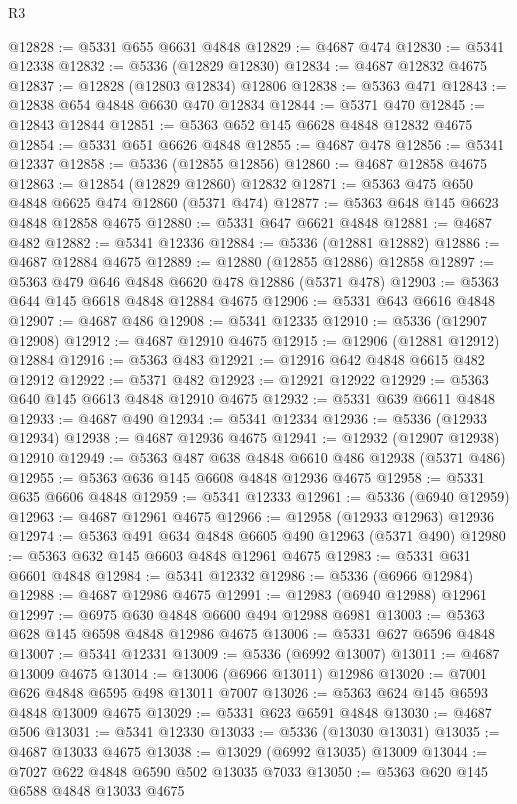 \begin{lexlean}{R3}
\begin{coremodule}
@12828 := @5331 @655 @6631 @4848
@12829 := @4687 @474
@12830 := @5341 @12338
@12832 := @5336 (@12829 @12830)
@12834 := @4687 @12832 @4675
@12837 := @12828 (@12803 @12834) @12806
@12838 := @5363 @471
@12843 := @12838 @654 @4848 @6630 @470 @12834
@12844 := @5371 @470
@12845 := @12843 @12844
@12851 := @5363 @652 @145 @6628 @4848 @12832 @4675
@12854 := @5331 @651 @6626 @4848
@12855 := @4687 @478
@12856 := @5341 @12337
@12858 := @5336 (@12855 @12856)
@12860 := @4687 @12858 @4675
@12863 := @12854 (@12829 @12860) @12832
@12871 := @5363 @475 @650 @4848 @6625 @474 @12860 (@5371 @474)
@12877 := @5363 @648 @145 @6623 @4848 @12858 @4675
@12880 := @5331 @647 @6621 @4848
@12881 := @4687 @482
@12882 := @5341 @12336
@12884 := @5336 (@12881 @12882)
@12886 := @4687 @12884 @4675
@12889 := @12880 (@12855 @12886) @12858
@12897 := @5363 @479 @646 @4848 @6620 @478 @12886 (@5371 @478)
@12903 := @5363 @644 @145 @6618 @4848 @12884 @4675
@12906 := @5331 @643 @6616 @4848
@12907 := @4687 @486
@12908 := @5341 @12335
@12910 := @5336 (@12907 @12908)
@12912 := @4687 @12910 @4675
@12915 := @12906 (@12881 @12912) @12884
@12916 := @5363 @483
@12921 := @12916 @642 @4848 @6615 @482 @12912
@12922 := @5371 @482
@12923 := @12921 @12922
@12929 := @5363 @640 @145 @6613 @4848 @12910 @4675
@12932 := @5331 @639 @6611 @4848
@12933 := @4687 @490
@12934 := @5341 @12334
@12936 := @5336 (@12933 @12934)
@12938 := @4687 @12936 @4675
@12941 := @12932 (@12907 @12938) @12910
@12949 := @5363 @487 @638 @4848 @6610 @486 @12938 (@5371 @486)
@12955 := @5363 @636 @145 @6608 @4848 @12936 @4675
@12958 := @5331 @635 @6606 @4848
@12959 := @5341 @12333
@12961 := @5336 (@6940 @12959)
@12963 := @4687 @12961 @4675
@12966 := @12958 (@12933 @12963) @12936
@12974 := @5363 @491 @634 @4848 @6605 @490 @12963 (@5371 @490)
@12980 := @5363 @632 @145 @6603 @4848 @12961 @4675
@12983 := @5331 @631 @6601 @4848
@12984 := @5341 @12332
@12986 := @5336 (@6966 @12984)
@12988 := @4687 @12986 @4675
@12991 := @12983 (@6940 @12988) @12961
@12997 := @6975 @630 @4848 @6600 @494 @12988 @6981
@13003 := @5363 @628 @145 @6598 @4848 @12986 @4675
@13006 := @5331 @627 @6596 @4848
@13007 := @5341 @12331
@13009 := @5336 (@6992 @13007)
@13011 := @4687 @13009 @4675
@13014 := @13006 (@6966 @13011) @12986
@13020 := @7001 @626 @4848 @6595 @498 @13011 @7007
@13026 := @5363 @624 @145 @6593 @4848 @13009 @4675
@13029 := @5331 @623 @6591 @4848
@13030 := @4687 @506
@13031 := @5341 @12330
@13033 := @5336 (@13030 @13031)
@13035 := @4687 @13033 @4675
@13038 := @13029 (@6992 @13035) @13009
@13044 := @7027 @622 @4848 @6590 @502 @13035 @7033
@13050 := @5363 @620 @145 @6588 @4848 @13033 @4675

\end{coremodule}
\end{lexlean}
